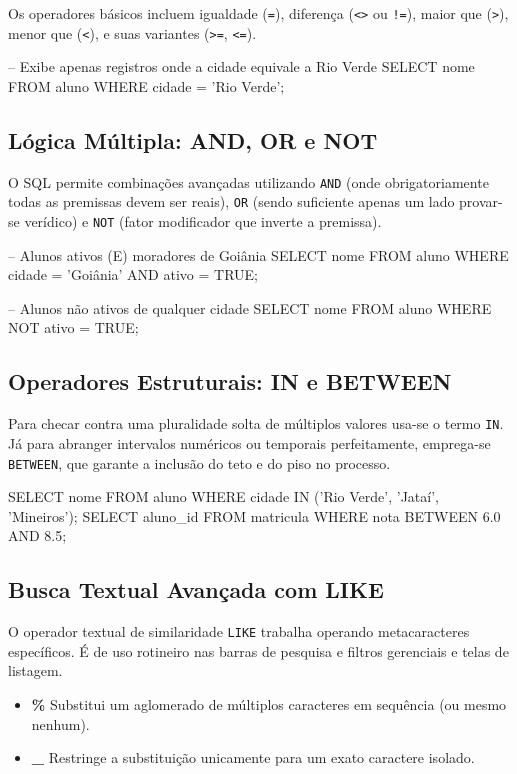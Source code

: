 Os operadores básicos incluem igualdade (\texttt{=}), diferença (\texttt{<>} ou \texttt{!=}), maior que (\texttt{>}), menor que (\texttt{<}), e suas variantes (\texttt{>=}, \texttt{<=}).

\begin{sqlcode}
-- Exibe apenas registros onde a cidade equivale a Rio Verde
SELECT nome FROM aluno WHERE cidade = 'Rio Verde';
\end{sqlcode}

\subsection{Lógica Múltipla: AND, OR e NOT}
O SQL permite combinações avançadas utilizando \texttt{AND} (onde obrigatoriamente todas as premissas devem ser reais), \texttt{OR} (sendo suficiente apenas um lado provar-se verídico) e \texttt{NOT} (fator modificador que inverte a premissa).

\begin{sqlcode}
-- Alunos ativos (E) moradores de Goiânia
SELECT nome FROM aluno WHERE cidade = 'Goiânia' AND ativo = TRUE;

-- Alunos não ativos de qualquer cidade
SELECT nome FROM aluno WHERE NOT ativo = TRUE;
\end{sqlcode}

\subsection{Operadores Estruturais: IN e BETWEEN}
Para checar contra uma pluralidade solta de múltiplos valores usa-se o termo \texttt{IN}. Já para abranger intervalos numéricos ou temporais perfeitamente, emprega-se \texttt{BETWEEN}, que garante a inclusão do teto e do piso no processo.

\begin{sqlcode}
SELECT nome FROM aluno WHERE cidade IN ('Rio Verde', 'Jataí', 'Mineiros');
SELECT aluno_id FROM matricula WHERE nota BETWEEN 6.0 AND 8.5;
\end{sqlcode}

\subsection{Busca Textual Avançada com LIKE}
O operador textual de similaridade \texttt{LIKE} trabalha operando metacaracteres específicos. É de uso rotineiro nas barras de pesquisa e filtros gerenciais e telas de listagem.
\begin{itemize}
    \item \textbf{\%} Substitui um aglomerado de múltiplos caracteres em sequência (ou mesmo nenhum).
    \item \textbf{\_} Restringe a substituição unicamente para um exato caractere isolado.
\end{itemize}


